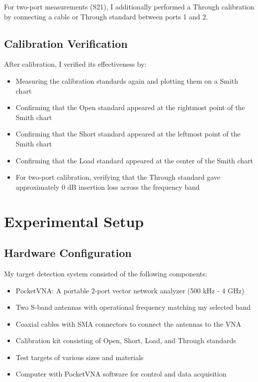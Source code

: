 \documentclass[11pt,a4paper]{article}
\begin{document}
For two-port measurements (S21), I additionally performed a Through calibration by connecting a cable or Through standard between ports 1 and 2.

\subsection{Calibration Verification}

After calibration, I verified its effectiveness by:

\begin{itemize}
    \item Measuring the calibration standards again and plotting them on a Smith chart
    \item Confirming that the Open standard appeared at the rightmost point of the Smith chart
    \item Confirming that the Short standard appeared at the leftmost point of the Smith chart
    \item Confirming that the Load standard appeared at the center of the Smith chart
    \item For two-port calibration, verifying that the Through standard gave approximately 0 dB insertion loss across the frequency band
\end{itemize}

\section{Experimental Setup}

\subsection{Hardware Configuration}

My target detection system consisted of the following components:

\begin{itemize}
    \item PocketVNA: A portable 2-port vector network analyzer (500 kHz - 4 GHz)
    \item Two S-band antennas with operational frequency matching my selected band
    \item Coaxial cables with SMA connectors to connect the antennas to the VNA
    \item Calibration kit consisting of Open, Short, Load, and Through standards
    \item Test targets of various sizes and materials
    \item Computer with PocketVNA software for control and data acquisition
\end{itemize}
\end{document}
